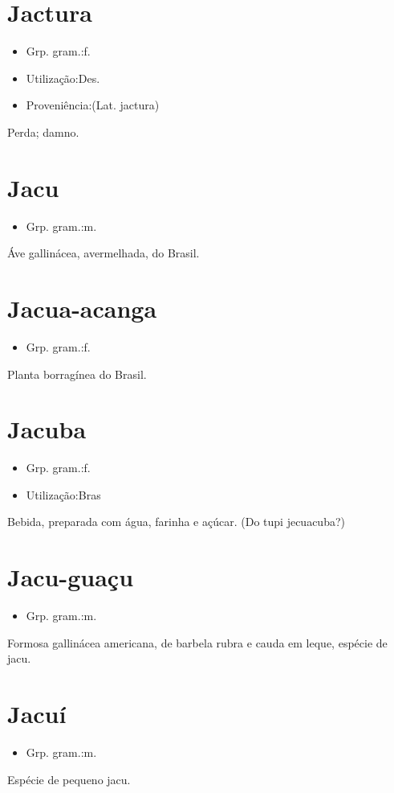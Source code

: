 \documentclass{article}
\begin{document}
\section{Jactura}
\begin{itemize}
\item {Grp. gram.:f.}
\end{itemize}
\begin{itemize}
\item {Utilização:Des.}
\end{itemize}
\begin{itemize}
\item {Proveniência:(Lat. \textunderscore jactura\textunderscore )}
\end{itemize}
Perda; damno.
\section{Jacu}
\begin{itemize}
\item {Grp. gram.:m.}
\end{itemize}
Áve gallinácea, avermelhada, do Brasil.
\section{Jacua-acanga}
\begin{itemize}
\item {Grp. gram.:f.}
\end{itemize}
Planta borragínea do Brasil.
\section{Jacuba}
\begin{itemize}
\item {Grp. gram.:f.}
\end{itemize}
\begin{itemize}
\item {Utilização:Bras}
\end{itemize}
Bebida, preparada com água, farinha e açúcar.
(Do tupi \textunderscore jecuacuba\textunderscore ?)
\section{Jacu-guaçu}
\begin{itemize}
\item {Grp. gram.:m.}
\end{itemize}
Formosa gallinácea americana, de barbela rubra e cauda em leque, espécie de jacu.
\section{Jacuí}
\begin{itemize}
\item {Grp. gram.:m.}
\end{itemize}
Espécie de pequeno jacu.
\end{document}
